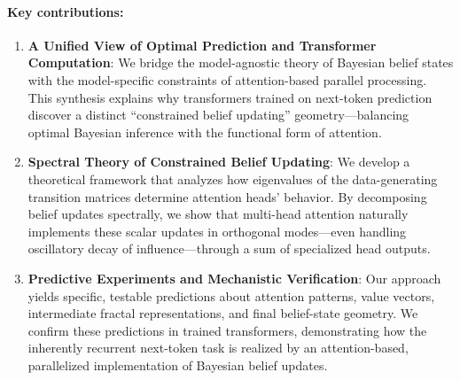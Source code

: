 \documentclass{article}
\theoremstyle{plain}
\theoremstyle{definition}
\theoremstyle{remark}
\begin{document}

\paragraph{Key contributions:}

\begin{enumerate}
    \item \textbf{A Unified View of Optimal Prediction and Transformer Computation}: We bridge the model-agnostic theory of Bayesian belief states with the model-specific constraints of attention-based parallel processing. This synthesis explains why transformers trained on next-token prediction discover a distinct “constrained belief updating” geometry—balancing optimal Bayesian inference with the functional form of attention.
    \item \textbf{Spectral Theory of Constrained Belief Updating}: 
    We develop a theoretical framework that analyzes how eigenvalues of the data-generating transition matrices determine attention heads’ behavior. By decomposing belief updates spectrally, we show that multi-head attention naturally implements these scalar updates in orthogonal modes---even handling oscillatory decay of influence---through a sum of specialized head outputs.
    \item \textbf{Predictive Experiments and Mechanistic Verification}: Our approach yields specific, testable predictions about attention patterns, value vectors, intermediate fractal representations, and final belief-state geometry. We confirm these predictions in trained transformers, demonstrating how the inherently recurrent next-token task is realized by an attention-based, parallelized implementation of Bayesian belief updates.
\end{enumerate}
\end{document}

